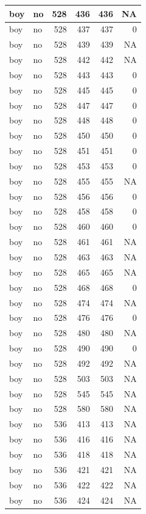 \documentclass[man]{apa6}
\begin{document}
\begin{tabular}{l|l|r|r|r|r}
\hline
boy & no & 528 & 436 & 436 & NA\\
\hline
boy & no & 528 & 437 & 437 & 0\\
\hline
boy & no & 528 & 439 & 439 & NA\\
\hline
boy & no & 528 & 442 & 442 & NA\\
\hline
boy & no & 528 & 443 & 443 & 0\\
\hline
boy & no & 528 & 445 & 445 & 0\\
\hline
boy & no & 528 & 447 & 447 & 0\\
\hline
boy & no & 528 & 448 & 448 & 0\\
\hline
boy & no & 528 & 450 & 450 & 0\\
\hline
boy & no & 528 & 451 & 451 & 0\\
\hline
boy & no & 528 & 453 & 453 & 0\\
\hline
boy & no & 528 & 455 & 455 & NA\\
\hline
boy & no & 528 & 456 & 456 & 0\\
\hline
boy & no & 528 & 458 & 458 & 0\\
\hline
boy & no & 528 & 460 & 460 & 0\\
\hline
boy & no & 528 & 461 & 461 & NA\\
\hline
boy & no & 528 & 463 & 463 & NA\\
\hline
boy & no & 528 & 465 & 465 & NA\\
\hline
boy & no & 528 & 468 & 468 & 0\\
\hline
boy & no & 528 & 474 & 474 & NA\\
\hline
boy & no & 528 & 476 & 476 & 0\\
\hline
boy & no & 528 & 480 & 480 & NA\\
\hline
boy & no & 528 & 490 & 490 & 0\\
\hline
boy & no & 528 & 492 & 492 & NA\\
\hline
boy & no & 528 & 503 & 503 & NA\\
\hline
boy & no & 528 & 545 & 545 & NA\\
\hline
boy & no & 528 & 580 & 580 & NA\\
\hline
boy & no & 536 & 413 & 413 & NA\\
\hline
boy & no & 536 & 416 & 416 & NA\\
\hline
boy & no & 536 & 418 & 418 & NA\\
\hline
boy & no & 536 & 421 & 421 & NA\\
\hline
boy & no & 536 & 422 & 422 & NA\\
\hline
boy & no & 536 & 424 & 424 & NA\\

\end{tabular}
\end{document}
